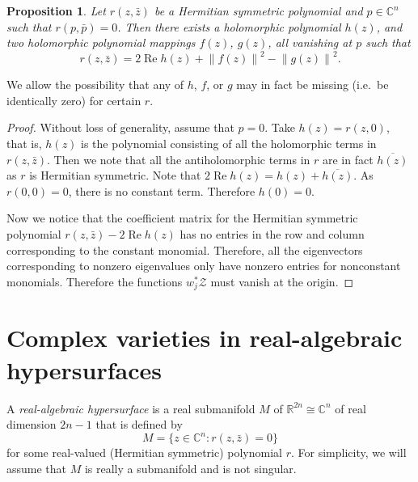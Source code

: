 \documentclass[12pt,openany]{book}
\renewcommand{\Re}{\operatorname{Re}}
\newcommand{\norm}[1]{\left\lVert {#1} \right\rVert}
\newcommand{\C}{{\mathbb{C}}}
\newcommand{\R}{{\mathbb{R}}}
\newcommand{\sZ}{{\mathcal{Z}}}
\newcommand{\myindex}[1]{#1\index{#1}}
\newcommand{\sectionnewpage}{}
\theoremstyle{plain}
\newtheorem{prop}[thm]{Proposition}
\theoremstyle{remark}
\theoremstyle{definition}
\theoremstyle{exercise}
\theoremstyle{example}
\begin{document}
\begin{prop} \label{prop:holdecpoly}
Let $r(z,\bar{z})$ be a Hermitian symmetric polynomial and
$p \in \C^n$ such that
$r(p,\bar{p}) = 0$.  Then there exists a holomorphic polynomial $h(z)$,
and two holomorphic polynomial mappings
$f(z)$,
$g(z)$, all vanishing at $p$ such that
\begin{equation}
r(z,\bar{z}) = 2 \Re h(z) + \norm{f(z)}^2-\norm{g(z)}^2 .
\end{equation}
\end{prop}

We allow the possibility that any of $h$, $f$, or $g$ may
in fact be missing (i.e.\ be identically zero) for certain $r$.

\begin{proof}
Without loss of generality, assume that $p=0$.  Take $h(z) = r(z,0)$,
that is, $h(z)$ is the
polynomial consisting of all the holomorphic terms in $r(z,\bar{z})$.  Then
we note that all the antiholomorphic terms in $r$ are in fact
$\overline{h(z)}$ as $r$ is Hermitian symmetric.  Note that
$2 \Re h(z) = h(z) + \overline{h(z)}$.  As $r(0,0) = 0$,
there is no constant term.  Therefore $h(0) = 0$.

Now we notice that the coefficient matrix for the
Hermitian symmetric polynomial $r(z,\bar{z}) - 2 \Re h(z)$
has no entries in the row and column corresponding to the constant monomial.
Therefore, all the eigenvectors corresponding to nonzero
eigenvalues only have nonzero entries for nonconstant monomials.  Therefore
the functions $w_j^* \sZ$ must vanish at the origin.
\end{proof}


\sectionnewpage
\section{Complex varieties in real-algebraic hypersurfaces}
\label{sec:curvinalg}

A \emph{\myindex{real-algebraic hypersurface}} is a real submanifold $M$
of $\R^{2n} \cong \C^n$ of real dimension $2n-1$ that is defined
by
\begin{equation*}
M = \{ z \in \C^n : r(z,\bar{z}) = 0 \}
\end{equation*}
for some real-valued (Hermitian symmetric)
polynomial $r$.  For simplicity, we will assume that $M$ is really a
submanifold and is not singular.
\end{document}
